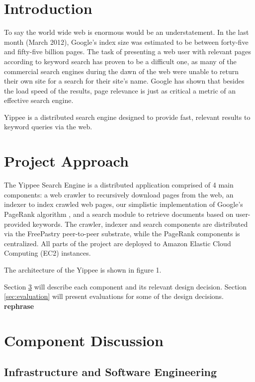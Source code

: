 \documentclass[11pt, letterpaper, oneside, twocolumn]{article}
\begin{document}
\section{ Introduction }

To say the world wide web is enormous would be an understatement.  
In the last month (March 2012),  Google's index size was estimated to be between forty-five and fifty-five billion pages.\cite{websize}
The task of presenting a web user with relevant pages according to keyword search has proven to be a difficult one, as many of the commercial search engines during the dawn of the web were unable to return their own site for a search for their site's name.\cite{google} 
Google has shown that besides the load speed of the results, page relevance is just as critical a metric of an effective search engine. 

Yippee is a distributed search engine designed to provide fast, relevant results to keyword queries via the web.  

\section{Project Approach}
\label{sec:approach}

The Yippee Search Engine is a distributed application comprised of 4 main components: a web crawler to recursively download pages from the web, an indexer to index crawled web pages, our simplistic implementation of Google's PageRank algorithm \cite{pagerank}, and a search module to retrieve documents based on user-provided keywords.  
The crawler, indexer and search components are distributed via the FreePastry peer-to-peer substrate, while the PageRank components is centralized.  All parts of the project are deployed to Amazon Elastic Cloud Computing (EC2) instances.  

The architecture of the Yippee is shown in figure 1.


Section \ref{sec:component} will describe each component and its relevant design decision.
Section \ref{sec:evaluation} will present evaluations for some of the design decisions. \textbf{rephrase}

\section{Component Discussion}
\label{sec:component}



\subsection{Infrastructure and Software Engineering}
\end{document}
